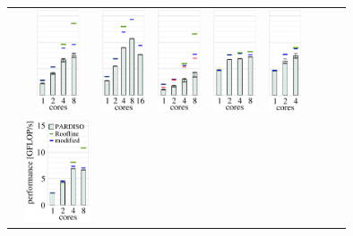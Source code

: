 \begin{tabular}{lcccccccc}
  & 
  \includegraphics[height=3.0cm,clip=true]{images/perf/p-80/p-meggie-omen-rgf-tc3_5}%
  & 
  \includegraphics[height=3.0cm,clip=true]{images/perf/p-80/p-skylakesp2-omen-rgf-tc3_5}%
  & 
  \includegraphics[height=3.0cm,clip=true]{images/perf/p-80/p-knightmare1-omen-rgf-tc3_5}%
  & 
  \includegraphics[height=3.0cm,clip=true]{images/perf/p-80/p-summitridge1-omen-rgf-tc3_5}%
  & 
  \includegraphics[height=3.0cm,clip=true]{images/perf/p-80/p-naples1-omen-rgf-tc3_5}%
\\
\raisebox{1.70cm}{\rotatebox[origin=c]{90}{omen3}} &
  \includegraphics[height=3.0cm,clip=true]{images/perf/p-80/p-emmy-omen-rgf-tc4_5}%

\end{tabular}
